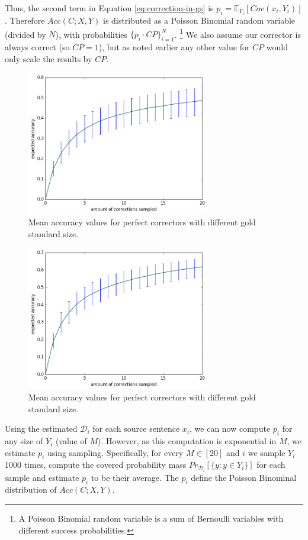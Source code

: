 \documentclass[letter,11pt]{article}
\begin{document}
Thus, the second
term in Equation \ref{eq:correction-in-gs} is $p_i = \mathbb{E}_{Y_i}[Cov(x_i,Y_i)]$. Therefore $Acc(C;X,Y)$ is distributed as
a Poisson Binomial random variable (divided by $N$), with probabilities $\{p_i \cdot CP\}_{i=1}^N$. \footnote{A Poisson Binomial random variable is a sum of Bernoulli variables with different success probabilities.} We also assume our corrector is always correct (so $CP=1$), but as noted earlier any other value for $CP$ would only scale the results by $CP$.

 \begin{figure}
   	\includegraphics[width=8cm]{exact__repeat_1000_accuracy}
 	\caption{Mean accuracy values for perfect correctors with different gold standard size.\label{fig:accuracy_vals}}
 \end{figure}
 \begin{figure}
   	\includegraphics[width=8cm]{index__repeat_1000_accuracy}
   \caption{Mean accuracy values for perfect correctors with different gold standard size.\label{fig:accuracy_vals_ind}}
 \end{figure}

 Using the estimated $\mathcal{D}_i$ for each source sentence $x_i$, we can now compute $p_i$ for any
 size of $Y_i$ (value of $M$). However, as this computation is exponential in $M$, we estimate $p_i$ using
 sampling. Specifically, for every $M\in[20]$ and $i$ we sample $Y_i$ 1000 times, compute 
 the covered probability mass $Pr_{\mathcal{D}_i}[\{y: y \in Y_i\}]$ for each sample and estimate $p_i$ to be their
 average. The $p_i$ define the Poisson Binominal distribution of $Acc(C;X,Y)$.
\end{document}

